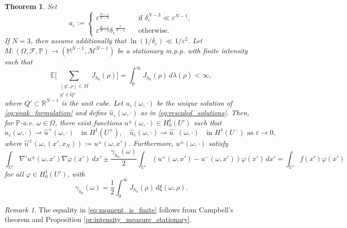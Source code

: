 \documentclass{article}
\numberwithin{equation}{section}
\newtheorem{theorem}{Theorem}[section]
\theoremstyle{definition}
\theoremstyle{remark}
\newtheorem{remark}{Remark}[theorem]
\begin{document}
\begin{theorem} \label{thm:homogenization_theorem}
    Set
    \[
    a_\varepsilon :=
    \begin{cases}
        \varepsilon^\frac{N - 1}{N - 3} \quad &\text{if } \delta_\varepsilon^{N - 3} \ll \varepsilon^{N - 1}, \\
        \varepsilon^\frac{N - 1}{N - 2} {\delta_\varepsilon}^\frac{1}{N - 2} \quad &\text{otherwise}.
    \end{cases}
    \]
    If $N = 3$, then assume additionally that $\ln(1/\delta_\varepsilon) \ll 1/\varepsilon^2$. Let $M : (\Omega, \mathcal{F}, \mathbb{P}) \rightarrow (\mathbb{M}^{N - 1}, \mathcal{M}^{N - 1})$ be a stationary m.p.p. with finite intensity such that
    \begin{equation} \label{eq:moment_is_finite}
        \mathbb{E}\Bigg[\sum \limits_{\substack{(y', \rho) \in M \\ y' \in Q'}} J_{h_0}(\rho)\Bigg] = \int_0^\infty J_{h_0}(\rho) \, d\lambda(\rho) < \infty,
    \end{equation}
    where $Q' \subset \mathbb{R}^{N - 1}$ is the unit cube. Let $u_\varepsilon(\omega, \cdot)$ be the unique solution of \eqref{eq:weak_formulation} and define $\hat{u}_\varepsilon(\omega, \cdot)$ as in \eqref{eq:rescaled_solutions}. Then, for $\mathbb{P}$-a.e. $\omega \in \Omega$, there exist functions $u^\pm(\omega, \cdot) \in H_0^1(U')$ such that
    \[
    \hat{u}_\varepsilon(\omega, \cdot) \rightharpoonup \hat{u}^+(\omega, \cdot) \quad \text{in } H^1(U^+), \quad \hat{u}_\varepsilon(\omega, \cdot) \rightharpoonup \hat{u}^-(\omega, \cdot) \quad \text{in } H^1(U^-) \text{ as } \varepsilon \to 0,
    \]
    where $\hat{u}^\pm(\omega, (x', x_N)) := u^\pm(\omega, x')$. Furthermore, $u^\pm(\omega, \cdot)$ satisfy
    \begin{equation} \label{eq:homogenized_equation}
        \int_{U'} \nabla' u^\pm(\omega, x') \nabla \varphi(x') \, dx' \pm \frac{\gamma_{h_0}(\omega)}{2} \int_{U'} (u^+(\omega, x') - u^-(\omega, x')) \varphi(x') \, dx' = \int_{U'} f(x') \varphi(x')
    \end{equation}
    for all $\varphi \in H_0^1(U')$, with
    \[
    \gamma_{h_0}(\omega) = \frac{1}{2} \int_0^\infty J_{h_0}(\rho) \, d\xi(\omega, \rho).
    \]
\end{theorem}

\begin{remark}
    The equality in \eqref{eq:moment_is_finite} follows from Campbell's theorem \cite[Theorem 2.3]{B} and Proposition \ref{pr:intensity_measure_stationary}.
\end{remark}
\end{document}
